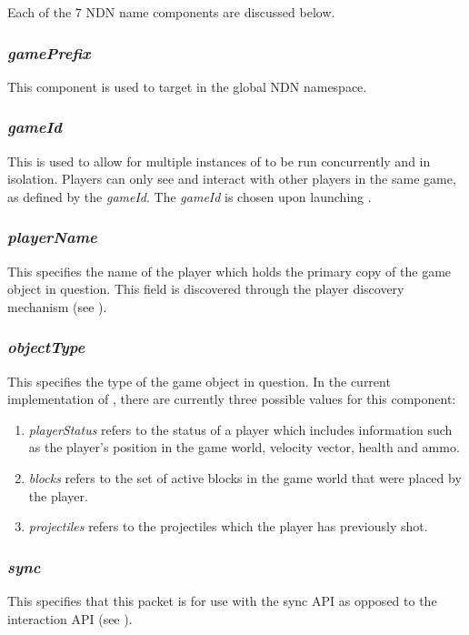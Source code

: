 Each of the 7 NDN name components are discussed below.

\subsubsection{\textit{gamePrefix}}
This component is used to target \game{} in the global NDN namespace.

\subsubsection{\textit{gameId}}
This is used to allow for multiple instances of \game{} to be run concurrently and in isolation. Players can only see and interact with other players in the same game, as defined by the \textit{gameId}. The \textit{gameId} is chosen upon launching \game{}.

\subsubsection{\textit{playerName}}
This specifies the name of the player which holds the primary copy of the game object in question. This field is discovered through the player discovery mechanism (see ).

\subsubsection{\textit{objectType}}
This specifies the type of the game object in question. In the current implementation of \game{}, there are currently three possible values for this component:
\begin{enumerate}
    \item \textit{playerStatus} refers to the status of a player which includes information such as the player's position in the game world, velocity vector, health and ammo.
    \item \textit{blocks} refers to the set of active blocks in the game world that were placed by the player.
    \item \textit{projectiles} refers to the projectiles which the player has previously shot.
\end{enumerate}

\subsubsection{\textit{sync}}
This specifies that this packet is for use with the sync API as opposed to the interaction API (see ).

